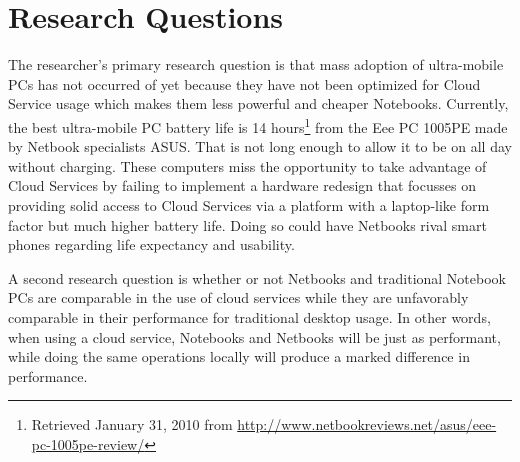 \section{Research Questions}


The researcher's primary research question is that mass adoption of ultra-mobile PCs
has not occurred of yet because they have not been optimized for Cloud Service
usage which makes them less powerful and cheaper Notebooks.  Currently,
the best ultra-mobile PC battery life is 14 hours\footnote{Retrieved January 31, 2010      %
from \url{http://www.netbookreviews.net/asus/eee-pc-1005pe-review/}} from the
Eee PC 1005PE made by Netbook specialists ASUS.  That is not long enough to
allow it to be on all day without charging.  These computers miss the
opportunity to take advantage of Cloud Services by failing to implement a
hardware redesign that focusses on providing solid access to Cloud Services via
a platform with a laptop-like form factor but much higher battery life.  Doing
so could have Netbooks rival smart phones regarding life expectancy and usability.


A second research question is whether or not Netbooks and traditional Notebook
PCs are comparable %
in the use of cloud services while they are unfavorably comparable in their
performance for traditional desktop usage.  In other words, when using a cloud
service, Notebooks and Netbooks will be just as performant, while doing the same
operations locally will produce a marked difference in performance.
